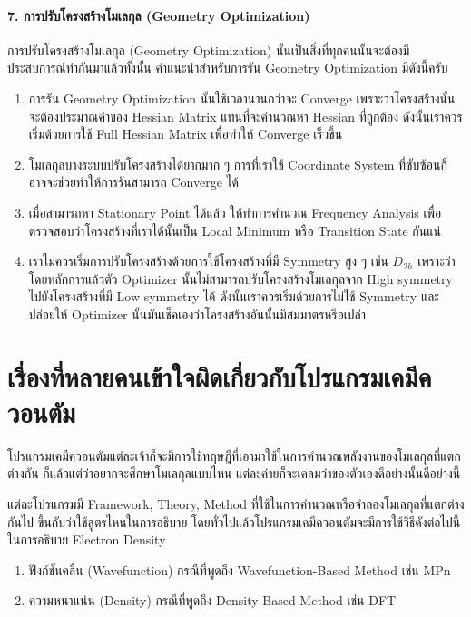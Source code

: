 \paragraph{7. การปรับโครงสร้างโมเลกุล (Geometry Optimization)}
%
การปรับโครงสร้างโมเลกุล (Geometry Optimization) นั้นเป็นสิ่งที่ทุกคนนั้นจะต้องมีประสบการณ์ทำกันมาแล้วทั้งนั้น คำแนะนำสำหรับการรัน Geometry Optimization มีดังนี้ครับ
%
\begin{enumerate}[topsep=0pt,noitemsep]
  \setlength\itemsep{0.5em}
  \item การรัน Geometry Optimization นั้นใช้เวลานานกว่าจะ Converge เพราะว่าโครงสร้างนั้นจะต้องประมาณค่าของ Hessian Matrix แทนที่จะคำนวณหา Hessian ที่ถูกต้อง ดังนั้นเราควรเริ่มด้วยการใช้ Full Hessian Matrix เพื่อทำให้ Converge เร็วขึ้น

  \item โมเลกุลบางระบบปรับโครงสร้างได้ยากมาก ๆ การที่เราใช้ Coordinate System ที่ซับซ้อนก็อาจจะช่วยทำให้การรันสามารถ Converge ได้

  \item เมื่อสามารถหา Stationary Point ได้แล้ว ให้ทำการคำนวณ Frequency Analysis เพื่อตรวจสอบว่าโครงสร้างที่เราได้นั้นเป็น Local Minimum หรือ Transition State กันแน่

  \item เราไม่ควรเริ่มการปรับโครงสร้างด้วยการใช้โครงสร้างที่มี Symmetry สูง ๆ เช่น $D_{2h}$ เพราะว่าโดยหลักการแล้วตัว Optimizer นั้นไม่สามารถปรับโครงสร้างโมเลกุลจาก High symmetry ไปยังโครงสร้างที่มี Low symmetry ได้ ดังนั้นเราควรเริ่มด้วยการไม่ใช้ Symmetry และปล่อยให้ Optimizer นั้นมันเช็คเองว่าโครงสร้างอันนั้นมีสมมาตรหรือเปล่า
\end{enumerate}

\section{เรื่องที่หลายคนเข้าใจผิดเกี่ยวกับโปรแกรมเคมีควอนตัม}

โปรแกรมเคมีควอนตัมแต่ละเจ้าก็จะมีการใช้ทฤษฎีที่เอามาใช้ในการคำนวณพลังงานของโมเลกุลที่แตกต่างกัน ก็แล้วแต่ว่าอยากจะศึกษาโมเลกุลแบบไหน แต่ละค่ายก็จะเคลมว่าของตัวเองดีอย่างนั้นดีอย่างนี้

แต่ละโปรแกรมมี Framework, Theory, Method ที่ใช้ในการคำนวณหรือจำลองโมเลกุลที่แตกต่างกันไป ขึ้นกับว่าใช้สูตรไหนในการอธิบาย โดยทั่วไปแล้วโปรแกรมเคมีควอนตัมจะมีการใช้วิธีดังต่อไปนี้ในการอธิบาย Electron Density
%
\begin{enumerate}[topsep=0pt,noitemsep]
  \setlength\itemsep{0.5em}
  \item ฟังก์ชันคลื่น (Wavefunction) กรณีที่พูดถึง Wavefunction-Based Method เช่น MPn

  \item ความหนาแน่น (Density) กรณีที่พูดถึง Density-Based Method เช่น DFT
\end{enumerate}


